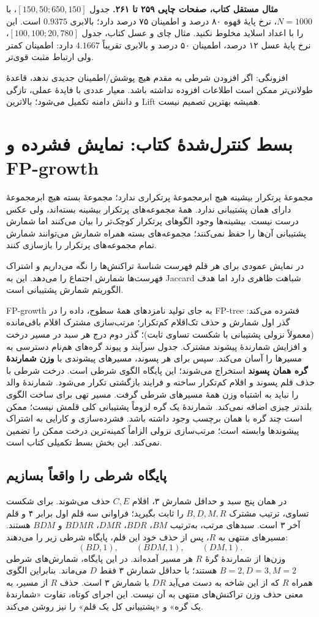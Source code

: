 \textbf{مثال مستقل کتاب، صفحات چاپی ۲۵۹ تا ۲۶۱.} جدول $[150,50;650,150]$، با $N=1000$، نرخ پایهٔ قهوه ۸۰ درصد و اطمینان ۷۵ درصد دارد؛ بالابری $0.9375$ است. این را با اعداد اسلاید مخلوط نکنید. مثال چای و عسل کتاب، جدول $[100,100;20,780]$، نرخ پایهٔ عسل ۱۲ درصد، اطمینان ۵۰ درصد و بالابری تقریباً $4.1667$ دارد: اطمینان کمتر ولی ارتباط مثبت قوی‌تر.

افزونگی: اگر افزودن شرطی به مقدم هیچ پوشش/اطمینان جدیدی ندهد، قاعدهٔ طولانی‌تر ممکن است اطلاعات افزوده نداشته باشد. معیار عددی با فایدهٔ عملی، تازگی و دانش دامنه تکمیل می‌شود؛ بالاترین Lift همیشه بهترین تصمیم نیست.

\section{بسط کنترل‌شدهٔ کتاب: نمایش فشرده و FP-growth}

مجموعهٔ پرتکرار بیشینه هیچ ابرمجموعهٔ پرتکراری ندارد؛ مجموعهٔ بسته هیچ ابرمجموعهٔ دارای همان پشتیبانی ندارد. همهٔ مجموعه‌های پرتکرار بیشینه بسته‌اند، ولی عکس درست نیست. بیشینه‌ها وجود الگوهای پرتکرار کوچک‌تر را بیان می‌کنند اما شمارش پشتیبانی آن‌ها را حفظ نمی‌کنند؛ مجموعه‌های بسته همراه شمارش می‌توانند شمارش تمام مجموعه‌های پرتکرار را بازسازی کنند.

در نمایش عمودی برای هر قلم فهرست شناسهٔ تراکنش‌ها را نگه می‌داریم و اشتراک فهرست‌ها شمارش اجتماع را می‌دهد. این به Jaccard شباهت ظاهری دارد اما هدف الگوریتم شمارش پشتیبانی است.

FP-growth به جای تولید نامزدهای همهٔ سطوح، داده را در FP-tree فشرده می‌کند: گذر اول شمارش و حذف تک‌اقلام کم‌تکرار؛ مرتب‌سازی مشترک اقلام باقی‌مانده (معمولاً نزولی پشتیبانی با شکست تساوی ثابت)؛ گذر دوم درج هر سبد در مسیر درخت و افزایش شمارندهٔ پیشوند مشترک. جدول سرآیند و پیوند گره‌های هم‌نام دسترسی به مسیرها را آسان می‌کند. سپس برای هر پسوند، مسیرهای پیشوندی با \textbf{وزن شمارندهٔ گره همان پسوند} استخراج می‌شوند؛ این پایگاه الگوی شرطی است. درخت شرطی با حذف قلم پسوند و اقلام کم‌تکرار ساخته و فرایند بازگشتی تکرار می‌شود. شمارندهٔ والد را نباید به اشتباه وزن همهٔ مسیرهای شرطی گرفت. مسیر تهی برای ساخت الگوی بلندتر چیزی اضافه نمی‌کند. شمارندهٔ یک گره لزوماً پشتیبانی کلی قلمش نیست؛ ممکن است چند گره با همان برچسب وجود داشته باشد. فشرده‌سازی و کارایی به اشتراک پیشوندها وابسته است؛ مرتب‌سازی نزولی الزاماً کمینه‌ترین درخت ممکن را تضمین نمی‌کند. این بخش بسط تکمیلی کتاب است.


\subsection*{پایگاه شرطی را واقعاً بسازیم}
در همان پنج سبد و حداقل شمارش ۳، اقلام $C,E$ حذف می‌شوند. برای شکست تساوی، ترتیب مشترک $B,D,M,R$ را ثابت بگیرید؛ فراوانی سه قلم اول برابر ۴ و قلم آخر ۳ است. سبدهای مرتب، به‌ترتیب $BM$، $BDR$، $DMR$، $BDMR$ و $BDM$ هستند. مسیرهای منتهی به $R$، پس از حذف خود این قلم، پایگاه شرطی زیر را می‌دهند:
\[ (BD,1),\qquad(BDM,1),\qquad(DM,1).\]
وزن‌ها از شمارندهٔ گرهٔ $R$ هر مسیر آمده‌اند. در این پایگاه، شمارش‌های شرطی $B=2,D=3,M=2$ هستند؛ با حداقل شمارش ۳ فقط $D$ می‌ماند. بنابراین الگوی همراه $R$ که از این شاخه به دست می‌آید $DR$ با شمارش ۳ است. حذف $R$ از مسیر، به معنی حذف وزن تراکنش‌های منتهی به آن نیست. این اجرای کوتاه، تفاوت «شمارندهٔ یک گره» و «پشتیبانی کل یک قلم» را نیز روشن می‌کند.

